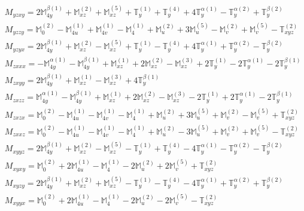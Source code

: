 \documentclass[fleqn,8pt,landscape]{jsarticle}
\begin{document}
\begin{align*}
& M_{yzxy} = 2 \mathbb{M}_{4y}^{\beta(1)} + \mathbb{M}_{xz}^{(2)} + \mathbb{M}_{xz}^{(5)} + \mathbb{T}_{y}^{(1)} + \mathbb{T}_{y}^{(4)} + 4 \mathbb{T}_{y}^{\alpha(1)} - \mathbb{T}_{y}^{\alpha(2)} + \mathbb{T}_{y}^{\beta(2)} \\
& M_{yzzy} = \mathbb{M}_{0}^{(2)} - \mathbb{M}_{4u}^{(1)} + \mathbb{M}_{4v}^{(1)} - \mathbb{M}_{4}^{(1)} + \mathbb{M}_{u}^{(2)} + 3 \mathbb{M}_{u}^{(5)} - \mathbb{M}_{v}^{(2)} + \mathbb{M}_{v}^{(5)} - \mathbb{T}_{xyz}^{(2)} \\
& M_{yzyx} = 2 \mathbb{M}_{4y}^{\beta(1)} + \mathbb{M}_{xz}^{(2)} - \mathbb{M}_{xz}^{(5)} + \mathbb{T}_{y}^{(1)} - \mathbb{T}_{y}^{(4)} + 4 \mathbb{T}_{y}^{\alpha(1)} + \mathbb{T}_{y}^{\alpha(2)} - \mathbb{T}_{y}^{\beta(2)} \\
& M_{zxxx} = - \mathbb{M}_{4y}^{\alpha(1)} - \mathbb{M}_{4y}^{\beta(1)} + \mathbb{M}_{xz}^{(1)} + 2 \mathbb{M}_{xz}^{(2)} - \mathbb{M}_{xz}^{(3)} + 2 \mathbb{T}_{y}^{(1)} - 2 \mathbb{T}_{y}^{\alpha(1)} - 2 \mathbb{T}_{y}^{\beta(1)} \\
& M_{zxyy} = 2 \mathbb{M}_{4y}^{\beta(1)} + \mathbb{M}_{xz}^{(1)} - \mathbb{M}_{xz}^{(3)} + 4 \mathbb{T}_{y}^{\beta(1)} \\
& M_{zxzz} = \mathbb{M}_{4y}^{\alpha(1)} - \mathbb{M}_{4y}^{\beta(1)} + \mathbb{M}_{xz}^{(1)} + 2 \mathbb{M}_{xz}^{(2)} - \mathbb{M}_{xz}^{(3)} - 2 \mathbb{T}_{y}^{(1)} + 2 \mathbb{T}_{y}^{\alpha(1)} - 2 \mathbb{T}_{y}^{\beta(1)} \\
& M_{zxzx} = \mathbb{M}_{0}^{(2)} - \mathbb{M}_{4u}^{(1)} - \mathbb{M}_{4v}^{(1)} - \mathbb{M}_{4}^{(1)} + \mathbb{M}_{u}^{(2)} + 3 \mathbb{M}_{u}^{(5)} + \mathbb{M}_{v}^{(2)} - \mathbb{M}_{v}^{(5)} + \mathbb{T}_{xyz}^{(2)} \\
& M_{zxxz} = \mathbb{M}_{0}^{(2)} - \mathbb{M}_{4u}^{(1)} - \mathbb{M}_{4v}^{(1)} - \mathbb{M}_{4}^{(1)} + \mathbb{M}_{u}^{(2)} - 3 \mathbb{M}_{u}^{(5)} + \mathbb{M}_{v}^{(2)} + \mathbb{M}_{v}^{(5)} - \mathbb{T}_{xyz}^{(2)} \\
& M_{xyyz} = 2 \mathbb{M}_{4y}^{\beta(1)} + \mathbb{M}_{xz}^{(2)} - \mathbb{M}_{xz}^{(5)} - \mathbb{T}_{y}^{(1)} + \mathbb{T}_{y}^{(4)} - 4 \mathbb{T}_{y}^{\alpha(1)} - \mathbb{T}_{y}^{\alpha(2)} - \mathbb{T}_{y}^{\beta(2)} \\
& M_{xyxy} = \mathbb{M}_{0}^{(2)} + 2 \mathbb{M}_{4u}^{(1)} - \mathbb{M}_{4}^{(1)} - 2 \mathbb{M}_{u}^{(2)} + 2 \mathbb{M}_{v}^{(5)} + \mathbb{T}_{xyz}^{(2)} \\
& M_{xyzy} = 2 \mathbb{M}_{4y}^{\beta(1)} + \mathbb{M}_{xz}^{(2)} + \mathbb{M}_{xz}^{(5)} - \mathbb{T}_{y}^{(1)} - \mathbb{T}_{y}^{(4)} - 4 \mathbb{T}_{y}^{\alpha(1)} + \mathbb{T}_{y}^{\alpha(2)} + \mathbb{T}_{y}^{\beta(2)} \\
& M_{xyyx} = \mathbb{M}_{0}^{(2)} + 2 \mathbb{M}_{4u}^{(1)} - \mathbb{M}_{4}^{(1)} - 2 \mathbb{M}_{u}^{(2)} - 2 \mathbb{M}_{v}^{(5)} - \mathbb{T}_{xyz}^{(2)}
\end{align*}
\end{document}
